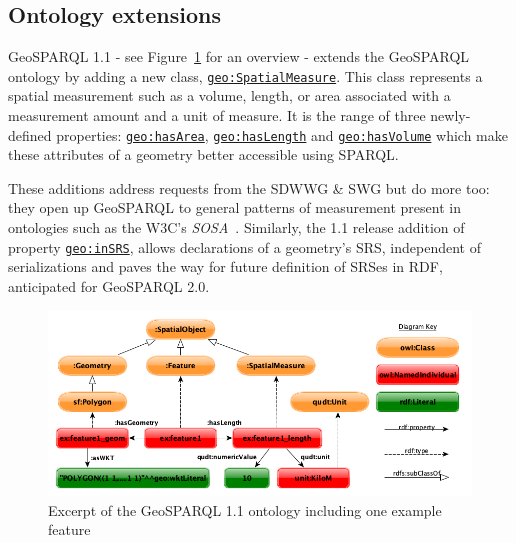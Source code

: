 \documentclass[runningheads]{llncs}
\begin{document}
\subsection{Ontology extensions}\label{sec:ontexts}
GeoSPARQL 1.1 - see Figure~\ref{fig:geosparql11ontology} for an overview - extends the GeoSPARQL ontology by adding a new class, \href{http://www.opengis.net/ont/geosparql#SpatialMeasure}{\texttt{geo:SpatialMeasure}}. This class represents a spatial measurement 
such as a volume, length, or area associated with a measurement amount and a unit of measure. It is the range of three newly-defined properties:
\href{http://www.opengis.net/ont/geosparql#hasArea}{\texttt{geo:hasArea}}, \href{http://www.opengis.net/ont/geosparql#hasLength}{\texttt{geo:hasLength}} and \href{http://www.opengis.net/ont/geosparql#hasVolume}{\texttt{geo:hasVolume}} which make these attributes of a geometry better accessible using 
SPARQL. 

These additions address requests from the SDWWG \& SWG but
do more too: they open up GeoSPARQL to general patterns of measurement present in ontologies 
such as the W3C's \textit{SOSA}~\cite{haller_semantic_2017}. Similarly, 
the 1.1 release addition of property \href{http://www.opengis.net/def/function/geosparql/inSRS}{\texttt{geo:inSRS}}, allows declarations of a geometry's SRS, independent of serializations and paves the way 
for future definition of SRSes in RDF, anticipated for GeoSPARQL 2.0.

\begin{figure}[htb]
    \centering
    \includegraphics[width=\linewidth]{images/geold_ontology.png}
    \caption{Excerpt of the GeoSPARQL 1.1 ontology including one example feature}
    \label{fig:geosparql11ontology}
\end{figure}
\end{document}
